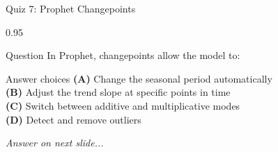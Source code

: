 \documentclass[9pt, aspectratio=169, t]{beamer}
\begin{document}
\begin{frame}{Quiz 7: Prophet Changepoints}
    \begin{cminipage}{0.95\textwidth}
    \begin{alertblock}{Question}
        In Prophet, changepoints allow the model to:
    \end{alertblock}

    \vspace{0.4cm}

    \begin{block}{Answer choices}
        \textcolor{MainBlue}{\textbf{(A)}} Change the seasonal period automatically\\[3pt]
        \textcolor{MainBlue}{\textbf{(B)}} Adjust the trend slope at specific points in time\\[3pt]
        \textcolor{MainBlue}{\textbf{(C)}} Switch between additive and multiplicative modes\\[3pt]
        \textcolor{MainBlue}{\textbf{(D)}} Detect and remove outliers
    \end{block}

    \vspace{0.5cm}

    \begin{center}
        \textit{Answer on next slide...}
    \end{center}
    \end{cminipage}
\end{frame}
\end{document}
